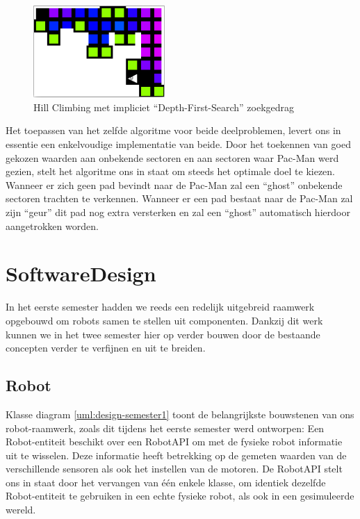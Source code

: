 \documentclass[12pt,a4paper]{report}
\begin{document}
\begin{figure}[htbp]
  \centering
  \includegraphics[width=50mm]{resources/dfs.png}
  \caption{Hill Climbing met impliciet ``Depth-First-Search'' zoekgedrag}
  \label{fig:dfs}
\end{figure}

Het toepassen van het zelfde algoritme voor beide deelproblemen, levert ons in essentie een enkelvoudige implementatie van beide. Door het toekennen van goed gekozen waarden aan onbekende sectoren en aan sectoren waar Pac-Man werd gezien, stelt het algoritme ons in staat om steeds het optimale doel te kiezen. Wanneer er zich geen pad bevindt naar de Pac-Man zal een ``ghost'' onbekende sectoren trachten te verkennen. Wanneer er een pad bestaat naar de Pac-Man zal zijn ``geur'' dit pad nog extra versterken en zal een ``ghost'' automatisch hierdoor aangetrokken worden.

\chapter{SoftwareDesign}

In het eerste semester hadden we reeds een redelijk uitgebreid raamwerk opgebouwd om robots samen te stellen uit componenten. Dankzij dit werk kunnen we in het twee semester hier op verder bouwen door de bestaande concepten verder te verfijnen en uit te breiden.

\section{Robot}

Klasse diagram \ref{uml:design-semester1} toont de belangrijkste bouwstenen van ons robot-raamwerk, zoals dit tijdens het eerste semester werd ontworpen: Een Robot-entiteit beschikt over een RobotAPI om met de fysieke robot informatie uit te wisselen. Deze informatie heeft betrekking op de gemeten waarden van de verschillende sensoren als ook het instellen van de motoren. De RobotAPI stelt ons in staat door het vervangen van \'e\'en enkele klasse, om identiek dezelfde Robot-entiteit te gebruiken in een echte fysieke robot, als ook in een gesimuleerde wereld.
\end{document}
